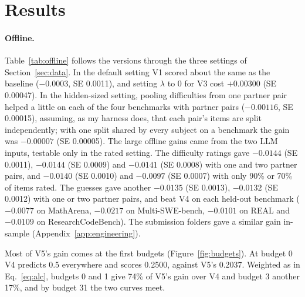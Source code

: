 \section{Results}\label{sec:results}

\paragraph{Offline.}
Table~\ref{tab:offline} follows the versions through the three settings of Section~\ref{sec:data}. In the default setting V1 scored about the same as the baseline ($-0.0003$, SE 0.0011), and setting $\lambda$ to 0 for V3 cost $+0.00300$ (SE 0.00047). In the hidden-sized setting, pooling difficulties from one partner pair helped a little on each of the four benchmarks with partner pairs ($-0.00116$, SE 0.00015), assuming, as my harness does, that each pair's items are split independently; with one split shared by every subject on a benchmark the gain was $-0.00007$ (SE 0.00005). The large offline gains came from the two LLM inputs, testable only in the rated setting. The difficulty ratings gave $-0.0144$ (SE 0.0011), $-0.0144$ (SE 0.0009) and $-0.0141$ (SE 0.0008) with one and two partner pairs, and $-0.0140$ (SE 0.0010) and $-0.0097$ (SE 0.0007) with only 90\% or 70\% of items rated. The guesses gave another $-0.0135$ (SE 0.0013), $-0.0132$ (SE 0.0012) with one or two partner pairs, and beat V4 on each held-out benchmark ($-0.0077$ on MathArena, $-0.0217$ on Multi-SWE-bench, $-0.0101$ on REAL and $-0.0109$ on ResearchCodeBench). The submission folders gave a similar gain in-sample (Appendix~\ref{app:engineering}).

\begin{table}[t]
  \caption{Offline Brier ALC (lower is better) in three settings, pooled over seeds 0--2. $\Delta$ is a row's score minus the score of the row above it on the same pair results (negative favors the row); the SE treats each subject--benchmark pair as a cluster. Blocks use different pairs, so their scores and differences cannot be added. V3 is worse than V1 and V2 offline in every block where they meet; I adopted it because of formative feedback (Appendix~\ref{app:rules}).}
  \label{tab:offline}
  \centering
  \small
  
\end{table}

Most of V5's gain comes at the first budgets (Figure~\ref{fig:budgets}). At budget 0 V4 predicts 0.5 everywhere and scores 0.2500, against V5's 0.2037. Weighted as in Eq.~\eqref{eq:alc}, budgets 0 and 1 give 74\% of V5's gain over V4 and budget 3 another 17\%, and by budget 31 the two curves meet.

